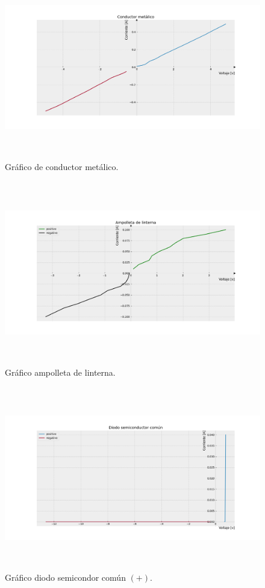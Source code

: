 \documentclass[]{article}
\begin{document}
\begin{figure}
  \centering
  \includegraphics[width=12cm, height=8cm]{img/Figure_2.png}
  \caption{\label{fig: fig-conductor}Gráfico de conductor metálico.} 
\end{figure}

\begin{figure}
  \centering
  \includegraphics[width=12cm, height=8cm]{img/Figure_1.png}
  \caption{\label{fig: fig-ampolleta}Gráfico ampolleta de linterna.} 
\end{figure}

\begin{figure}
  \centering
  \includegraphics[width=12cm, height=8cm]{img/Figure_3.png}
  \caption{\label{fig: diodo-comun}Gráfico diodo semicondor común $(+)$.} 
\end{figure}
\end{document}
